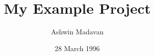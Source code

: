 \documentclass[12pt]{article}
\begin{document}
\title{My Example Project}
\author{Ashwin Madavan}
\date{28 March 1996}
\maketitle
\end{document}
